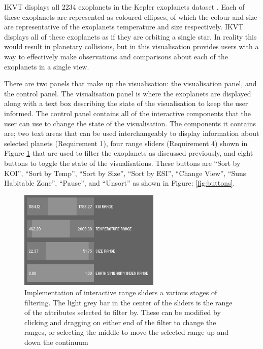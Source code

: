 IKVT displays all 2234 exoplanets
in the Kepler exoplanets dataset \cite{dataset}. Each of these exoplanets are
represented as coloured
ellipses, of which the colour and size are representative of the exoplanets
temperature and size respectively. IKVT displays all of these exoplanets as if
they are orbiting a single star. In reality this would result in planetary
collisions, but in this visualisation provides users with a way to effectively
make observations and comparisons about each of the exoplanets in a single
view. 

There are two panels that make up the visualisation: the visualisation panel,
and the control panel. The visualisation panel is where the exoplanets
are displayed along with a text box describing the state of the visualisation
to
keep the user informed. The control panel contains all of the interactive
components that the user can use to change the state of the visualisation. The
components it contains are; two text areas that can be used interchangeably to
display information about selected planets (Requirement 1), four range sliders
(Requirement 4) shown in Figure 
\ref{fig:sliders} that are used to
filter the exoplanets as discussed previously, and eight buttons to toggle the
state of the visualisations. These buttons are ``Sort by KOI'', ``Sort by Temp'',
``Sort by Size'', ``Sort by ESI'', ``Change View'', ``Suns Habitable Zone'', ``Pause'',
and ``Unsort'' as shown in Figure: \ref{fig:buttons}. 

\begin{figure}[H]
  \centering
      \includegraphics[width=0.6\textwidth]{images/sliders.jpg}
  \caption[Implementation of interactive range sliders]{Implementation of
interactive range sliders a various stages of filtering. The light grey bar in
the center of the sliders is the range of the attributes selected to filter by.
These can be modified by clicking and dragging on either end of the filter to
change the ranges, or selecting the middle to move the selected range up and
down the continuum}
  \label{fig:sliders}
\end{figure}

